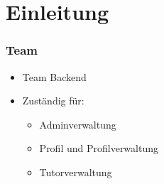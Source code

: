 \section{Einleitung}
\begin{frame}
\frametitle{Team}
 \begin{itemize}
  \item Team Backend
  \item Zuständig für:
  \begin{itemize}
  \item Adminverwaltung
  \item Profil und Profilverwaltung
  \item Tutorverwaltung
 \end{itemize}
\end{itemize}

\end{frame}
